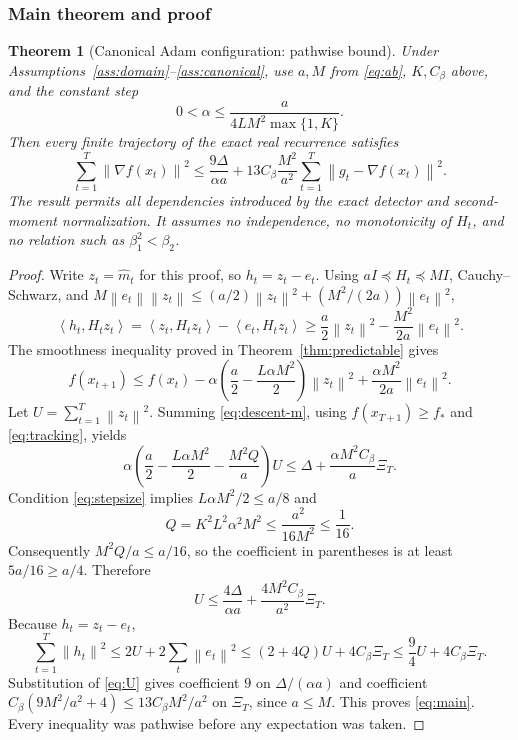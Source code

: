 \documentclass[11pt,a4paper]{article}
\newtheorem{theorem}{Theorem}[section]
\theoremstyle{definition}
\theoremstyle{remark}
\newcommand{\norm}[1]{\left\lVert#1\right\rVert}
\newcommand{\ip}[2]{\left\langle#1,#2\right\rangle}
\begin{document}
\subsubsection{Main theorem and proof}
\begin{theorem}[Canonical Adam configuration: pathwise bound]\label{thm:main}
Under Assumptions~\ref{ass:domain}--\ref{ass:canonical}, use $a,M$ from
\eqref{eq:ab}, $K,C_\beta$ above, and the constant step
\begin{equation}\label{eq:stepsize}
 0<\alpha\le\frac{a}{4LM^2\max\{1,K\}}.
\end{equation}
Then every finite trajectory of the exact real recurrence satisfies
\begin{equation}\label{eq:main}
 \sum_{t=1}^T\norm{\nabla f(x_t)}^2
 \le \frac{9\Delta}{\alpha a}
       +13C_\beta\frac{M^2}{a^2}\sum_{t=1}^T\norm{g_t-\nabla f(x_t)}^2.
\end{equation}
The result permits all dependencies introduced by the exact detector and
second-moment normalization. It assumes no independence, no monotonicity of
$H_t$, and no relation such as $\beta_1^2<\beta_2$.
\end{theorem}
\begin{proof}
Write $z_t=\widehat m_t$ for this proof, so $h_t=z_t-e_t$.
Using $aI\preceq H_t\preceq MI$, Cauchy--Schwarz, and
$M\norm{e_t}\norm{z_t}\le(a/2)\norm{z_t}^2+(M^2/(2a))\norm{e_t}^2$,
\[
 \ip{h_t}{H_tz_t}
 =\ip{z_t}{H_tz_t}-\ip{e_t}{H_tz_t}
 \ge\frac a2\norm{z_t}^2-\frac{M^2}{2a}\norm{e_t}^2.
\]
The smoothness inequality proved in Theorem~\ref{thm:predictable} gives
\begin{equation}\label{eq:descent-m}
 f(x_{t+1})\le f(x_t)
 -\alpha\left(\frac a2-\frac{L\alpha M^2}{2}\right)\norm{z_t}^2
 +\frac{\alpha M^2}{2a}\norm{e_t}^2.
\end{equation}
Let $U=\sum_{t=1}^T\norm{z_t}^2$. Summing \eqref{eq:descent-m}, using
$f(x_{T+1})\ge f_*$ and \eqref{eq:tracking}, yields
\begin{equation}\label{eq:absorb}
 \alpha\left(\frac a2-\frac{L\alpha M^2}{2}-\frac{M^2Q}{a}\right)U
 \le \Delta+\frac{\alpha M^2C_\beta}{a}\Xi_T.
\end{equation}
Condition \eqref{eq:stepsize} implies
$L\alpha M^2/2\le a/8$ and
\[
 Q=K^2L^2\alpha^2M^2\le\frac{a^2}{16M^2}\le\frac1{16}.
\]
Consequently $M^2Q/a\le a/16$, so the coefficient in parentheses is at least
$5a/16\ge a/4$. Therefore
\begin{equation}\label{eq:U}
 U\le\frac{4\Delta}{\alpha a}+\frac{4M^2C_\beta}{a^2}\Xi_T.
\end{equation}
Because $h_t=z_t-e_t$,
\[
 \sum_{t=1}^T\norm{h_t}^2
 \le2U+2\sum_t\norm{e_t}^2
 \le(2+4Q)U+4C_\beta\Xi_T
 \le\frac94 U+4C_\beta\Xi_T.
\]
Substitution of \eqref{eq:U} gives coefficient $9$ on
$\Delta/(\alpha a)$ and coefficient
$C_\beta(9M^2/a^2+4)\le13C_\beta M^2/a^2$ on $\Xi_T$,
since $a\le M$. This proves \eqref{eq:main}.
Every inequality was pathwise before any expectation was taken.
\end{proof}
\end{document}

